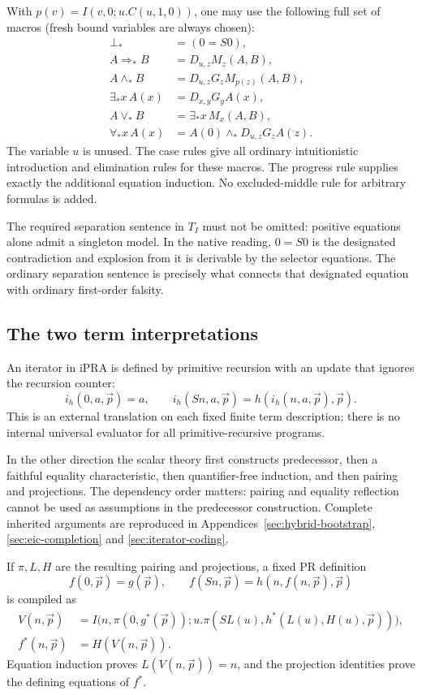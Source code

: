 \documentclass[11pt]{article}
\theoremstyle{definition}
\theoremstyle{remark}
\begin{document}
With \(p(v)=I(v,0;u.C(u,1,0))\), one may use the following full set of
macros (fresh bound variables are always chosen):
\begin{align*}
 \bot_*&=(0=S0),\\
 A\Rightarrow_* B&=D_{u,z}M_z(A,B),\\
 A\wedge_* B&=D_{u,z}G_zM_{p(z)}(A,B),\\
 \exists_*x\,A(x)&=D_{x,y}G_yA(x),\\
 A\vee_*B&=\exists_*x\,M_x(A,B),\\
 \forall_*x\,A(x)&=A(0)\wedge_*D_{u,z}G_zA(z).
\end{align*}
The variable \(u\) is unused. The case rules give all ordinary
intuitionistic introduction and elimination rules for these macros.
The progress rule supplies exactly the additional equation induction.
No excluded-middle rule for arbitrary formulas is added.

The required separation sentence in \(T_I\) must not be omitted:
positive equations alone admit a singleton model. In the native reading,
\(0=S0\) is the designated contradiction and explosion from it is
derivable by the selector equations. The ordinary separation sentence
is precisely what connects that designated equation with ordinary
first-order falsity.

\subsection{The two term interpretations}

An iterator in iPRA is defined by primitive recursion with an update that
ignores the recursion counter:
\[
 i_h(0,a,\vec p)=a,\qquad
 i_h(Sn,a,\vec p)=h(i_h(n,a,\vec p),\vec p).
\]
This is an external translation on each fixed finite term description;
there is no internal universal evaluator for all primitive-recursive
programs.

In the other direction the scalar theory first constructs predecessor,
then a faithful equality characteristic, then quantifier-free induction,
and then pairing and projections. The dependency order matters: pairing
and equality reflection cannot be used as assumptions in the predecessor
construction. Complete inherited arguments are reproduced in
Appendices~\ref{sec:hybrid-bootstrap}, \ref{sec:eic-completion} and
\ref{sec:iterator-coding}.

If \(\pi,L,H\) are the resulting pairing and projections, a fixed PR
definition
\[
 f(0,\vec p)=g(\vec p),\qquad
 f(Sn,\vec p)=h(n,f(n,\vec p),\vec p)
\]
is compiled as
\begin{align*}
 V(n,\vec p)&=I\bigl(n,\pi(0,g^*(\vec p));
 u.\pi(SL(u),h^*(L(u),H(u),\vec p))\bigr),\\
 f^*(n,\vec p)&=H(V(n,\vec p)).
\end{align*}
Equation induction proves \(L(V(n,\vec p))=n\), and the projection
identities prove the defining equations of \(f^*\).
\end{document}
